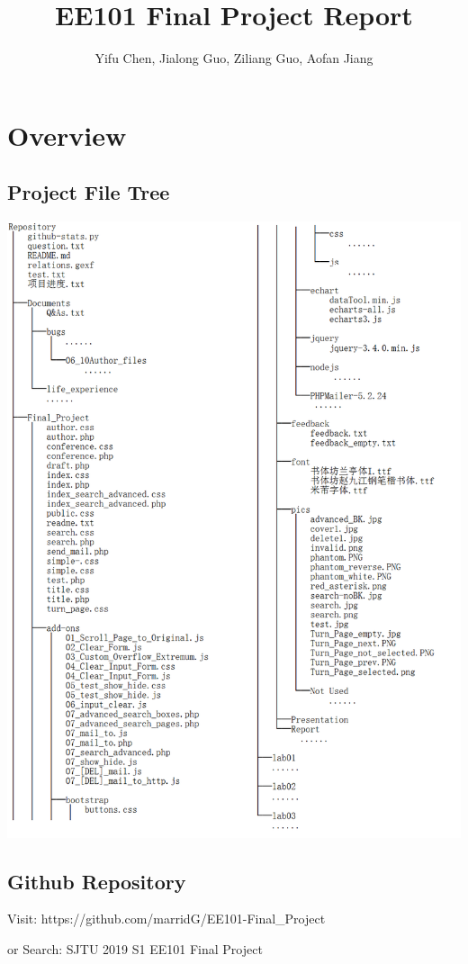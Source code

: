 \documentclass[10pt,twoside,a4paper,titlepage]{article}
\title{EE101 Final Project Report}
\author{Yifu Chen, Jialong Guo, Ziliang Guo, Aofan Jiang}
\begin{document}
\maketitle
\phantom{s}
\thispagestyle{empty}
\clearpage

\tableofcontents
\thispagestyle{empty}
\newpage
\setcounter{page}{1}

\section{Overview}
\subsection{Project File Tree}
	\includegraphics[width=1\textwidth]{gzl/00.png}

\subsection{Github Repository}
Visit: https://github.com/marridG/EE101-Final\_Project\par
or Search: SJTU 2019 S1 EE101 Final Project
\end{document}

